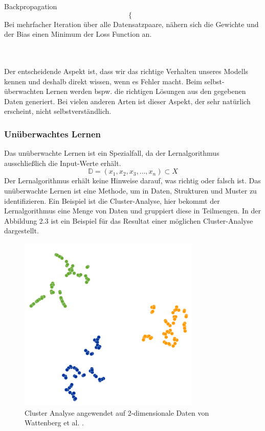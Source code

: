 \documentclass[12pt,letterpaper,ngerman]{article}
\begin{document}
\begin{definition}{Backpropagation}
\[\begin{cases}
        \end{cases}
    \]
    Bei mehrfacher Iteration über alle Datensatzpaare,
    nähern sich die Gewichte und der Bias einen Minimum
    der Loss Function an.
\end{definition}
\hfill
\\\\
Der entscheidende Aspekt ist, dass wir das richtige Verhalten unseres Modells 
kennen und deshalb direkt wissen, wenn es Fehler macht. Beim selbst-überwachten
Lernen werden bspw. die richtigen Lösungen aus den gegebenen Daten generiert. 
Bei vielen anderen Arten ist dieser Aspekt, der sehr natürlich erscheint,
nicht selbstverständlich.
\subsubsection{Unüberwachtes Lernen}
Das unüberwachte Lernen ist ein Spezialfall, da der Lernalgorithmus
ausschließlich die Input-Werte erhält.
\[\mathbb{D} = (x_1, x_2, x_3, \dots, x_n) \subset X\]
Der Lernalgorithmus erhält keine Hinweise darauf, was richtig oder 
falsch ist. Das unüberwachte Lernen ist eine Methode, um in Daten,
Strukturen und Muster zu identifizieren. Ein Beispiel ist die
Cluster-Analyse, hier bekommt der Lernalgorithmus eine Menge von 
Daten und gruppiert diese in Teilmengen. In der Abbildung 2.3 ist 
ein Beispiel für das Resultat einer
möglichen Cluster-Analyse dargestellt.
\begin{figure}[H]
  \centering
  \includegraphics[scale=0.3]{abb/t-sne-example.png}
  \caption{Cluster Analyse angewendet auf 2-dimensionale Daten von 
    Wattenberg et al. \cite{wattenberg2016how}.
  }
\end{figure}
\end{document}

